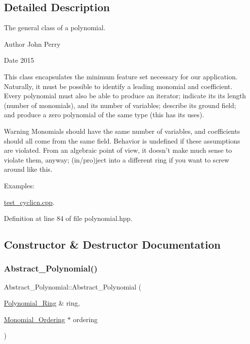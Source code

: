 \subsection{Detailed Description}
The general class of a polynomial. 

\begin{DoxyAuthor}{Author}
John Perry 
\end{DoxyAuthor}
\begin{DoxyDate}{Date}
2015
\end{DoxyDate}
This class encapsulates the minimum feature set necessary for our application. Naturally, it must be possible to identify a leading monomial and coefficient. Every polynomial must also be able to produce an iterator; indicate its its length (number of monomials), and its number of variables; describe its ground field; and produce a zero polynomial of the same type (this has its uses).

\begin{DoxyWarning}{Warning}
Monomials should have the same number of variables, and coefficients should all come from the same field. Behavior is undefined if these assumptions are violated. From an algebraic point of view, it doesn't make much sense to violate them, anyway; (in/pro)ject into a different ring if you want to screw around like this. 
\end{DoxyWarning}
\begin{Desc}
\item[Examples\+: ]\par
\hyperlink{test_cyclicn_8cpp-example}{test\+\_\+cyclicn.\+cpp}.\end{Desc}


Definition at line 84 of file polynomial.\+hpp.



\subsection{Constructor \& Destructor Documentation}
\mbox{\label{class_abstract___polynomial_a01ef6bad0c81aeefb11252e86de91362}} 
\subsubsection{\texorpdfstring{Abstract\+\_\+\+Polynomial()}{Abstract\_Polynomial()}}
{\footnotesize\ttfamily Abstract\+\_\+\+Polynomial\+::\+Abstract\+\_\+\+Polynomial (\begin{DoxyParamCaption}\item[{\hyperlink{class_polynomial___ring}{Polynomial\+\_\+\+Ring} \&}]{ring,  }\item[{\hyperlink{class_monomial___ordering}{Monomial\+\_\+\+Ordering} $\ast$}]{ordering }\end{DoxyParamCaption})\hspace{0.3cm}{\ttfamily [inline]}}


